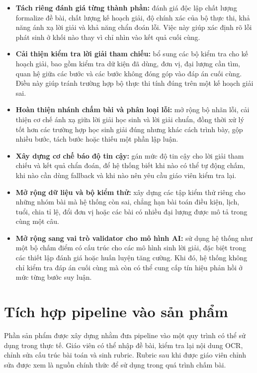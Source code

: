 \documentclass[12pt,a4paper]{article}
\begin{document}
\begin{itemize}[leftmargin=*]
\item \textbf{Tách riêng đánh giá từng thành phần:}
đánh giá độc lập chất lượng formalize đề bài, chất lượng kế hoạch giải, độ chính xác của bộ thực thi, khả năng ánh xạ lời giải và khả năng chẩn đoán lỗi. Việc này giúp xác định rõ lỗi phát sinh ở khối nào thay vì chỉ nhìn vào kết quả cuối cùng.

\item \textbf{Cải thiện kiểm tra lời giải tham chiếu:}
bổ sung các bộ kiểm tra cho kế hoạch giải, bao gồm kiểm tra dữ kiện đã dùng, đơn vị, đại lượng cần tìm, quan hệ giữa các bước và các bước không đóng góp vào đáp án cuối cùng. Điều này giúp tránh trường hợp bộ thực thi tính đúng trên một kế hoạch giải sai.

\item \textbf{Hoàn thiện nhánh chấm bài và phân loại lỗi:}
mở rộng bộ nhãn lỗi, cải thiện cơ chế ánh xạ giữa lời giải học sinh và lời giải chuẩn, đồng thời xử lý tốt hơn các trường hợp học sinh giải đúng nhưng khác cách trình bày, gộp nhiều bước, tách bước hoặc thiếu một phần lập luận.

\item \textbf{Xây dựng cơ chế báo độ tin cậy:}
gán mức độ tin cậy cho lời giải tham chiếu và kết quả chẩn đoán, để hệ thống biết khi nào có thể tự động chấm, khi nào cần dùng fallback và khi nào nên yêu cầu giáo viên kiểm tra lại.

\item \textbf{Mở rộng dữ liệu và bộ kiểm thử:}
xây dựng các tập kiểm thử riêng cho những nhóm bài mà hệ thống còn sai, chẳng hạn bài toán điều kiện, lịch, tuổi, chia tỉ lệ, đổi đơn vị hoặc các bài có nhiều đại lượng được mô tả trong cùng một câu.

\item \textbf{Mở rộng sang vai trò validator cho mô hình AI:}
sử dụng hệ thống như một bộ chấm điểm có cấu trúc cho các mô hình sinh lời giải, đặc biệt trong các thiết lập đánh giá hoặc huấn luyện tăng cường. Khi đó, hệ thống không chỉ kiểm tra đáp án cuối cùng mà còn có thể cung cấp tín hiệu phản hồi ở mức từng bước suy luận.

\end{itemize}


\section{Tích hợp pipeline vào sản phẩm}

Phần sản phẩm được xây dựng nhằm đưa pipeline vào một quy trình có thể sử dụng
trong thực tế. Giáo viên có thể nhập đề bài, kiểm tra lại nội dung OCR, chỉnh sửa
cấu trúc bài toán và sinh rubric. Rubric sau khi được giáo viên chỉnh sửa được
xem là nguồn chính thức để sử dụng trong quá trình chấm bài.
\end{document}
